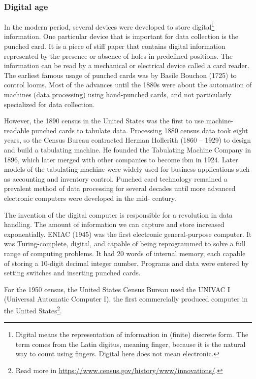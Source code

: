 \subsubsection{Digital age}

In the modern period, several devices were developed to store digital\footnote{Digital
means the representation of information in (finite) discrete form.  The term comes from the Latin
digitus, meaning finger, because it is the natural way to count using fingers.  Digital
here does not mean electronic.}
information.  One particular device that is important for data collection is the punched
card.  It is a piece of stiff paper that contains digital information represented by the
presence or absence of holes in predefined positions.  The information can be read by a
mechanical or electrical device called a card reader.  The earliest famous usage of
punched cards was by Basile Bouchon (1725) to control looms.  Most of the advances until
the 1880s were about the automation of machines (data processing) using hand-punched cards, and not
particularly specialized for data collection.

However, the 1890 census in the United States was the first to use machine-readable
punched cards to tabulate data. Processing 1880 census data took eight years, so the
Census Bureau contracted Herman Hollerith (1860 -- 1929) to design and build a tabulating
machine.  He founded the Tabulating Machine Company in 1896, which later merged with other
companies to become \gls{ibm} in 1924. Later
models of the tabulating machine were widely used for business applications such as
accounting and inventory control. Punched card technology remained a prevalent method of
data processing for several decades until more advanced electronic computers were
developed in the mid- century.

The invention of the digital computer is responsible for a revolution in data handling.
The amount of information we can capture and store increased exponentially.  ENIAC (1945) was
the first electronic general-purpose computer.  It was Turing-complete, digital, and
capable of being reprogrammed to solve a full range of computing problems.
It had 20 words of internal memory, each capable of storing a 10-digit decimal integer number.
Programs and data were entered by setting switches and inserting punched cards.

For the 1950 census, the United States Census Bureau used the
UNIVAC I (Universal Automatic Computer I), the first commercially produced computer in the
United States\footnote{Read more in \url{https://www.census.gov/history/www/innovations/}.}.

